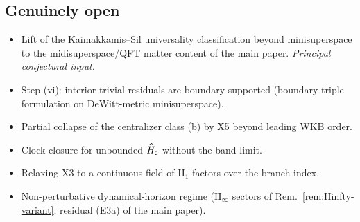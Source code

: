 \documentclass[11pt,a4paper]{article}
\theoremstyle{definition}
\theoremstyle{remark}
\begin{document}
\subsection*{Genuinely open}
\begin{itemize}[leftmargin=*,nosep]
  \item[\textbf{O1}] Lift of the Kaimakkamis--Sil universality
    classification beyond minisuperspace to the
    midisuperspace/QFT matter content of the main paper.
    \emph{Principal conjectural input.}
  \item[\textbf{O2}] Step (vi): interior-trivial residuals are
    boundary-supported (boundary-triple formulation on
    DeWitt-metric minisuperspace).
  \item[\textbf{O3}] Partial collapse of the centralizer class
    (b) by X5 beyond leading WKB order.
  \item[\textbf{O4}] Clock closure for unbounded
    $\widehat H_{\rm c}$ without the band-limit.
  \item[\textbf{O5}] Relaxing X3 to a continuous field of
    II$_1$ factors over the branch index.
  \item[\textbf{O6}] Non-perturbative dynamical-horizon regime
    (II$_\infty$ sectors of Rem.~\ref{rem:IIinfty-variant};
    residual (E3a) of the main paper).
\end{itemize}
\end{document}
